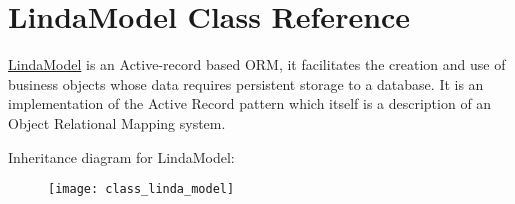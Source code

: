 \hypertarget{class_linda_model}{}\section{Linda\+Model Class Reference}
\label{class_linda_model}


\hyperlink{class_linda_model}{Linda\+Model} is an Active-\/record based O\+R\+M, it facilitates the creation and use of business objects whose data requires persistent storage to a database. It is an implementation of the Active Record pattern which itself is a description of an Object Relational Mapping system.  


Inheritance diagram for Linda\+Model\+:\begin{figure}[H]
\begin{center}
\leavevmode
\texttt{[image: class\_linda\_model]}
\end{center}
\end{figure}
